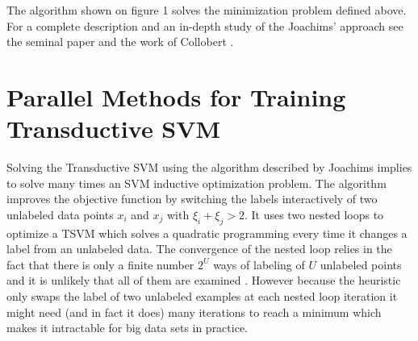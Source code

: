 The algorithm shown on figure 1 solves the minimization problem defined above. For a complete description and an in-depth study of the Joachims' approach see the seminal paper \cite{Joachims99c}
and the work of Collobert \cite{1248609}.

%
\section{Parallel Methods for Training Transductive SVM}
%
Solving the Transductive SVM using the algorithm described by Joachims
implies to solve  many times an SVM inductive optimization problem. The
algorithm improves the objective function by switching the labels
interactively of two unlabeled data points $x_{i}$ and $x_{j}$ with
$\xi_{i}+\xi_{j}>2$. It uses two nested loops to optimize a TSVM
which solves a quadratic programming every time it changes a label
from an unlabeled data. The convergence of the nested loop relies
in the fact that there is only a finite number $2^{U}$ ways of labeling
of $U$ unlabeled points and it is unlikely that all of them are examined
\cite{1248609}. However because the heuristic only swaps the label
of two unlabeled examples at each nested loop iteration it might need
(and in fact it does) many iterations to reach a minimum which makes
it intractable for big data sets in practice.

